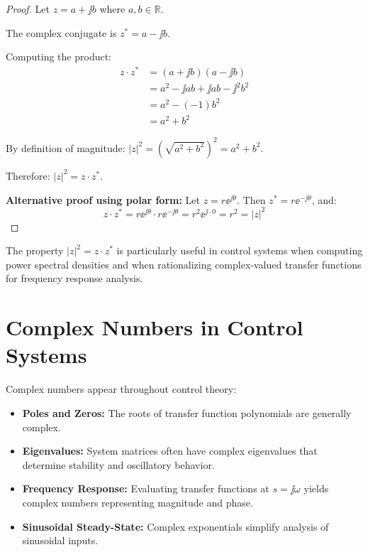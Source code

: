 \begin{proof}
Let $z = a + \jj b$ where $a, b \in \mathbb{R}$.

The complex conjugate is $z^* = a - \jj b$.

Computing the product:
\begin{align*}
z \cdot z^* &= (a + \jj b)(a - \jj b) \\
&= a^2 - \jj ab + \jj ab - \jj^2 b^2 \\
&= a^2 - (-1)b^2 \\
&= a^2 + b^2
\end{align*}

By definition of magnitude: $|z|^2 = (\sqrt{a^2 + b^2})^2 = a^2 + b^2$.

Therefore: $|z|^2 = z \cdot z^*$.

\textbf{Alternative proof using polar form:} Let $z = r\ee^{\jj\theta}$. Then $z^* = r\ee^{-\jj\theta}$, and:
\begin{equation*}
z \cdot z^* = r\ee^{\jj\theta} \cdot r\ee^{-\jj\theta} = r^2 \ee^{\jj \cdot 0} = r^2 = |z|^2
\end{equation*}
\end{proof}

\begin{note}
The property $|z|^2 = z \cdot z^*$ is particularly useful in control systems when computing power spectral densities and when rationalizing complex-valued transfer functions for frequency response analysis.
\end{note}

\section{Complex Numbers in Control Systems}

Complex numbers appear throughout control theory:

\begin{itemize}
    \item \textbf{Poles and Zeros:} The roots of transfer function polynomials are generally complex.
    \item \textbf{Eigenvalues:} System matrices often have complex eigenvalues that determine stability and oscillatory behavior.
    \item \textbf{Frequency Response:} Evaluating transfer functions at $s = \jj\omega$ yields complex numbers representing magnitude and phase.
    \item \textbf{Sinusoidal Steady-State:} Complex exponentials simplify analysis of sinusoidal inputs.
\end{itemize}

